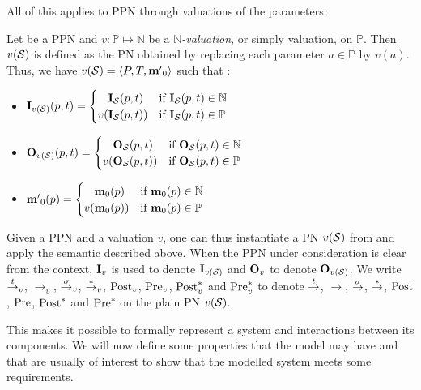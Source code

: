 All of this applies to \ac{PPN} through valuations of the parameters:
\begin{defi}
  Let \SPTPm be a \ac{PPN} and $v : \mathbb{P} \mapsto \mathbb{N}$ be a \emph{$\mathbb{N}$-valuation}, or simply valuation, on $\mathbb{P}$.
  Then $v(\mathcal{S})$ is defined as the \ac{PN} obtained by replacing each parameter $a \in \mathbb{P}$ by $v(a)$.
  Thus, we have $v(\mathcal{S}) = \langle P, T, \mathbf{m'}_0\rangle$ such that :
  \begin{itemize}
    \item $\mathbf{I}_{v(\mathcal{S})}(p, t) =
      \begin{cases}
        \phantom{v(}\mathbf{I}_\mathcal{S}(p, t) & \text{if } \mathbf{I}_\mathcal{S}(p, t) \in \mathbb{N} \\
                 v(\mathbf{I}_\mathcal{S}(p, t)) & \text{if } \mathbf{I}_\mathcal{S}(p, t) \in \mathbb{P}
      \end{cases}$
    \item $\mathbf{O}_{v(\mathcal{S})}(p, t) =
      \begin{cases}
        \phantom{v(}\mathbf{O}_\mathcal{S}(p, t) & \text{if } \mathbf{O}_\mathcal{S}(p, t) \in \mathbb{N} \\
                 v(\mathbf{O}_\mathcal{S}(p, t)) & \text{if } \mathbf{O}_\mathcal{S}(p, t) \in \mathbb{P}
      \end{cases}$
    \item $\mathbf{m'}_0(p) =
      \begin{cases}
        \phantom{v(}\mathbf{m}_0(p) & \text{if } \mathbf{m}_0(p) \in \mathbb{N} \\
                 v(\mathbf{m}_0(p)) & \text{if } \mathbf{m}_0(p) \in \mathbb{P}
      \end{cases}$
  \end{itemize}
\end{defi}

Given \tupleS a \ac{PPN} and a valuation $v$, one can thus instantiate a \ac{PN} $v(\mathcal{S})$ from \tupleS and apply the semantic described above.  When the \ac{PPN} under consideration is clear from the context, $\mathbf{I}_v$ is used to denote $\mathbf{I}_{v(\mathcal{S})}$ and $\mathbf{O}_v$ to denote $\mathbf{O}_{v(\mathcal{S})}$. We write $\stackrel{t}{\to}_v$, $\rightarrow_v$, $\stackrel{\sigma}{\to}_v$, $\stackrel{*}{\to}_v$, $\operatorname{Post}_v$, $\operatorname{Pre}_v$, $\operatorname{Post}^*_v$ and $\operatorname{Pre}^*_v$ to denote $\stackrel{t}{\to}$, $\rightarrow$, $\stackrel{\sigma}{\to}$, $\stackrel{*}{\to}$, $\operatorname{Post}$, $\operatorname{Pre}$, $\operatorname{Post}^*$ and $\operatorname{Pre}^*$ on the plain \ac{PN} $v(\mathcal{S})$.

This makes it possible to formally represent a system and interactions between its components. We will now define some properties that the model may have and that are usually of interest to show that the modelled system meets some requirements.

